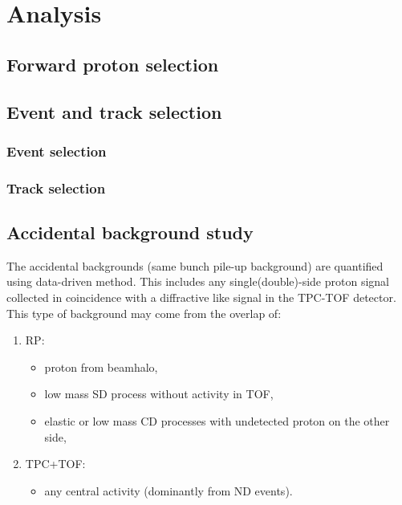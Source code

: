 \chapter{Analysis}\label{chap:analysis}
\section{Forward proton selection}
\section{Event and track selection}
\subsection{Event selection}
\subsection{Track selection}
\section{Accidental background study}

The accidental backgrounds (same bunch pile-up background) are quantified using data-driven method. This includes any single(double)-side proton signal collected in coincidence with a diffractive like signal in the TPC-TOF detector. This type of background may come from the overlap of:
\begin{enumerate}
	\item RP:
	\begin{itemize}
		\item proton from beamhalo,
		\item low mass SD process without activity in TOF,
		\item elastic or low mass CD processes with undetected proton on the other side,
	\end{itemize}
	\item TPC+TOF:
	\begin{itemize}
		\item any central activity (dominantly from ND events).
	\end{itemize}
\end{enumerate}
